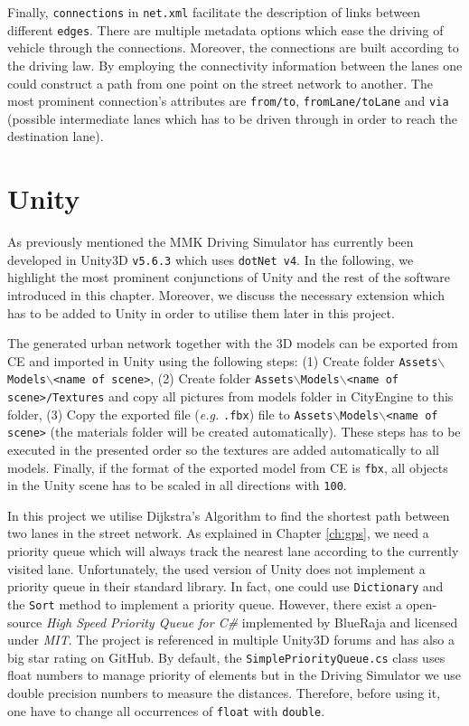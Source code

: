 Finally, \texttt{connections} in \texttt{net.xml} facilitate the description of links between different \texttt{edges}. There are multiple metadata options which ease the driving of vehicle through the connections. Moreover, the connections are built according to the driving law. By employing the connectivity information between the lanes one could construct a path from one point on the street network to another. The most prominent connection's attributes are \texttt{from/to}, \texttt{fromLane/toLane} and \texttt{via} (possible intermediate lanes which has to be driven through in order to reach the destination lane). 

\section{Unity}
\label{ch:unity}
As previously mentioned the MMK Driving Simulator has currently been developed  in Unity3D \texttt{v5.6.3} which uses \texttt{dotNet v4}. In the following, we highlight the most prominent conjunctions of Unity and the rest of the software introduced in this chapter. Moreover, we discuss the necessary extension which has to be added to Unity in order to utilise them later in this project.

The generated urban network together with the 3D models can be exported from CE and imported in Unity using the following steps: (1) Create folder \texttt{Assets$\backslash$Models$\backslash$<name of scene>}, (2) Create folder \texttt{Assets$\backslash$Models$\backslash$<name of scene>/Textures} and copy all pictures from models folder in CityEngine to this folder, (3) Copy the exported file (\emph{e.g.} \texttt{.fbx}) file to \texttt{Assets$\backslash$Models$\backslash$<name of scene>} (the materials folder will be created automatically). These steps has to be executed in the presented order so the textures are added automatically to all models. Finally, if the format of the exported model from CE is \texttt{fbx}, all objects in the Unity scene has to be scaled in all directions with \texttt{100}.

In this project we utilise Dijkstra's Algorithm to find the shortest path between two lanes in the street network. As explained in Chapter \ref{ch:gps}, we need a priority queue which will always track the nearest lane according to the currently visited lane. Unfortunately, the used version of Unity does not implement a priority queue in their standard library. In fact, one could use \texttt{Dictionary} and the \texttt{Sort} method to implement a priority queue. However, there exist a open-source \emph{High Speed Priority Queue for C\#}\cite{pq} implemented by BlueRaja and licensed under \emph{MIT}. The project is referenced in multiple Unity3D forums and has also a big star rating on GitHub. By default, the \texttt{SimplePriorityQueue.cs} class uses float numbers to manage priority of elements but in the Driving Simulator we use double precision numbers to measure the distances. Therefore, before using it, one have to change all occurrences of \texttt{float} with \texttt{double}.

